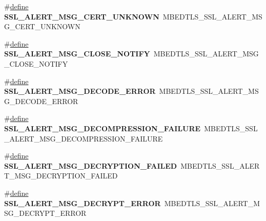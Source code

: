 \begin{DoxyCompactItemize}
\#\hyperlink{structdefine}{define} {\bfseries S\+S\+L\+\_\+\+A\+L\+E\+R\+T\+\_\+\+M\+S\+G\+\_\+\+C\+E\+R\+T\+\_\+\+U\+N\+K\+N\+O\+WN}~M\+B\+E\+D\+T\+L\+S\+\_\+\+S\+S\+L\+\_\+\+A\+L\+E\+R\+T\+\_\+\+M\+S\+G\+\_\+\+C\+E\+R\+T\+\_\+\+U\+N\+K\+N\+O\+WN
\item 
\mbox{\label{compat-1_83_8h_ad14b12418d867f679ae512c85172437d}} 
\#\hyperlink{structdefine}{define} {\bfseries S\+S\+L\+\_\+\+A\+L\+E\+R\+T\+\_\+\+M\+S\+G\+\_\+\+C\+L\+O\+S\+E\+\_\+\+N\+O\+T\+I\+FY}~M\+B\+E\+D\+T\+L\+S\+\_\+\+S\+S\+L\+\_\+\+A\+L\+E\+R\+T\+\_\+\+M\+S\+G\+\_\+\+C\+L\+O\+S\+E\+\_\+\+N\+O\+T\+I\+FY
\item 
\mbox{\label{compat-1_83_8h_a850d74ffe2fb34a9c8e9502413a50fb6}} 
\#\hyperlink{structdefine}{define} {\bfseries S\+S\+L\+\_\+\+A\+L\+E\+R\+T\+\_\+\+M\+S\+G\+\_\+\+D\+E\+C\+O\+D\+E\+\_\+\+E\+R\+R\+OR}~M\+B\+E\+D\+T\+L\+S\+\_\+\+S\+S\+L\+\_\+\+A\+L\+E\+R\+T\+\_\+\+M\+S\+G\+\_\+\+D\+E\+C\+O\+D\+E\+\_\+\+E\+R\+R\+OR
\item 
\mbox{\label{compat-1_83_8h_a6d4c809b89c68492e6bff977e580006a}} 
\#\hyperlink{structdefine}{define} {\bfseries S\+S\+L\+\_\+\+A\+L\+E\+R\+T\+\_\+\+M\+S\+G\+\_\+\+D\+E\+C\+O\+M\+P\+R\+E\+S\+S\+I\+O\+N\+\_\+\+F\+A\+I\+L\+U\+RE}~M\+B\+E\+D\+T\+L\+S\+\_\+\+S\+S\+L\+\_\+\+A\+L\+E\+R\+T\+\_\+\+M\+S\+G\+\_\+\+D\+E\+C\+O\+M\+P\+R\+E\+S\+S\+I\+O\+N\+\_\+\+F\+A\+I\+L\+U\+RE
\item 
\mbox{\label{compat-1_83_8h_a9747c1125f8a52082305522b85553578}} 
\#\hyperlink{structdefine}{define} {\bfseries S\+S\+L\+\_\+\+A\+L\+E\+R\+T\+\_\+\+M\+S\+G\+\_\+\+D\+E\+C\+R\+Y\+P\+T\+I\+O\+N\+\_\+\+F\+A\+I\+L\+ED}~M\+B\+E\+D\+T\+L\+S\+\_\+\+S\+S\+L\+\_\+\+A\+L\+E\+R\+T\+\_\+\+M\+S\+G\+\_\+\+D\+E\+C\+R\+Y\+P\+T\+I\+O\+N\+\_\+\+F\+A\+I\+L\+ED
\item 
\mbox{\label{compat-1_83_8h_ae944de2c846156585bee4200ef789392}} 
\#\hyperlink{structdefine}{define} {\bfseries S\+S\+L\+\_\+\+A\+L\+E\+R\+T\+\_\+\+M\+S\+G\+\_\+\+D\+E\+C\+R\+Y\+P\+T\+\_\+\+E\+R\+R\+OR}~M\+B\+E\+D\+T\+L\+S\+\_\+\+S\+S\+L\+\_\+\+A\+L\+E\+R\+T\+\_\+\+M\+S\+G\+\_\+\+D\+E\+C\+R\+Y\+P\+T\+\_\+\+E\+R\+R\+OR
\item 
\mbox{\label{compat-1_83_8h_a243347f3447592161fd255351344cfbc}} 

\end{DoxyCompactItemize}
